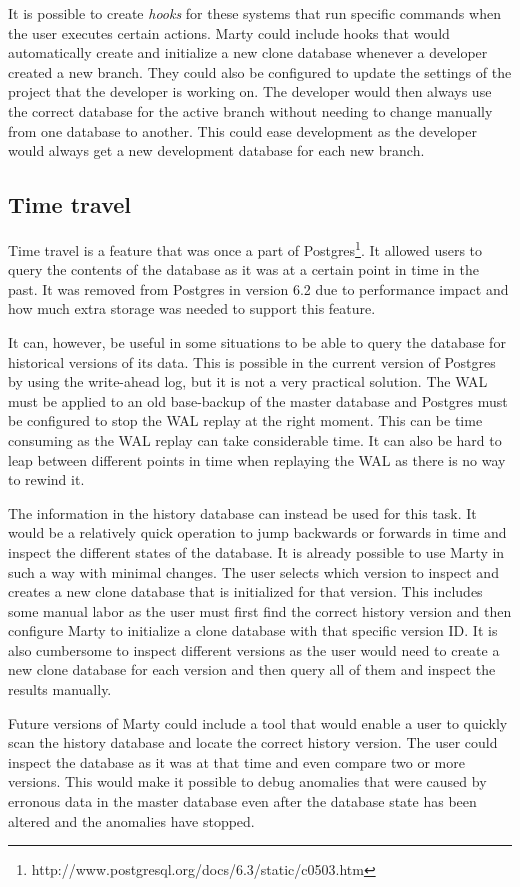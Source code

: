 It is possible to create \textit{hooks} for these systems that run specific commands when the user executes certain actions.
Marty could include hooks that would automatically create and initialize a new clone database whenever a developer created a new branch.
They could also be configured to update the settings of the project that the developer is working on.
The developer would then always use the correct database for the active branch without needing to change manually from one database to another.
This could ease development as the developer would always get a new development database for each new branch.

\subsection{Time travel}
Time travel is a feature that was once a part of Postgres\footnote{http://www.postgresql.org/docs/6.3/static/c0503.htm}.
It allowed users to query the contents of the database as it was at a certain point in time in the past.
It was removed from Postgres in version 6.2 due to performance impact and how much extra storage was needed to support this feature.

It can, however, be useful in some situations to be able to query the database for historical versions of its data.
This is possible in the current version of Postgres by using the write-ahead log, but it is not a very practical solution.
The WAL must be applied to an old base-backup of the master database and Postgres must be configured to stop the WAL replay at the right moment.
This can be time consuming as the WAL replay can take considerable time.
It can also be hard to leap between different points in time when replaying the WAL as there is no way to rewind it.

The information in the history database can instead be used for this task.
It would be a relatively quick operation to jump backwards or forwards in time and inspect the different states of the database.
It is already possible to use Marty in such a way with minimal changes.
The user selects which version to inspect and creates a new clone database that is initialized for that version.
This includes some manual labor as the user must first find the correct history version and then configure Marty to initialize a clone database with that specific version ID.
It is also cumbersome to inspect different versions as the user would need to create a new clone database for each version and then query all of them and inspect the results manually.

Future versions of Marty could include a tool that would enable a user to quickly scan the history database and locate the correct history version.
The user could inspect the database as it was at that time and even compare two or more versions.
This would make it possible to debug anomalies that were caused by erronous data in the master database even after the database state has been altered and the anomalies have stopped.
